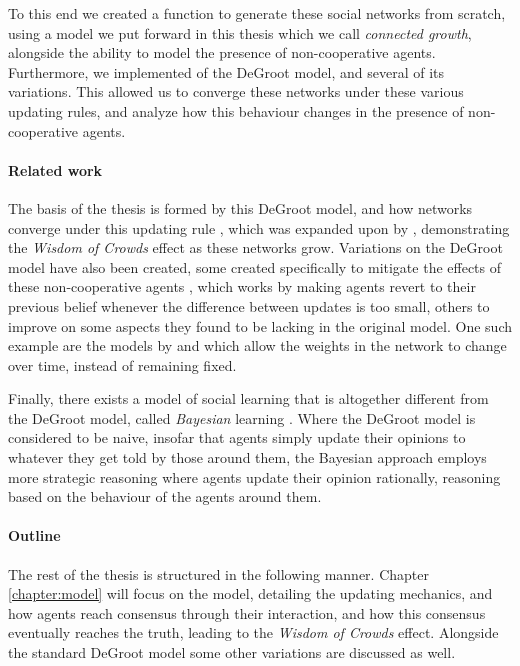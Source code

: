 \documentclass[a4paper, 12pt]{report}
\begin{document}
To this end we created a function to generate these social networks from scratch, using a model we put forward in this thesis which we call \emph{connected growth}, alongside the ability to model the presence of non-cooperative agents. Furthermore, we implemented of the DeGroot model, and several of its variations. This allowed us to converge these networks under these various updating rules, and analyze how this behaviour changes in the presence of non-cooperative agents.



\paragraph{Related work}
The basis of the thesis is formed by this DeGroot model, and how networks converge under this updating rule \parencite{degroot1974concensus}, which was expanded upon by \cite{jackson2010social}, demonstrating the \emph{Wisdom of Crowds} effect as these networks grow. Variations on the DeGroot model have also been created, some created specifically to mitigate the effects of these non-cooperative agents \parencite{amir2021robust}, which works by making agents revert to their previous belief whenever the difference between updates is too small, others to improve on some aspects they found to be lacking in the original model. One such example are the models by \cite{chatterjee1977stochastic} and \cite{demarzo2003changing} which allow the weights in the network to change over time, instead of remaining fixed.

Finally, there exists a model of social learning that is altogether different from the DeGroot model, called \emph{Bayesian} learning \parencite{GALE2003329}. Where the DeGroot model is considered to be naive, insofar that agents simply update their opinions to whatever they get told by those around them, the Bayesian approach employs more strategic reasoning where agents update their opinion rationally, reasoning based on the behaviour of the agents around them.

\paragraph{Outline}
The rest of the thesis is structured in the following manner. Chapter \ref{chapter:model} will focus on the model, detailing the updating mechanics, and how agents reach consensus through their interaction, and how this consensus eventually reaches the truth, leading to the \emph{Wisdom of Crowds} effect. Alongside the standard DeGroot model some other variations are discussed as well.
\end{document}
